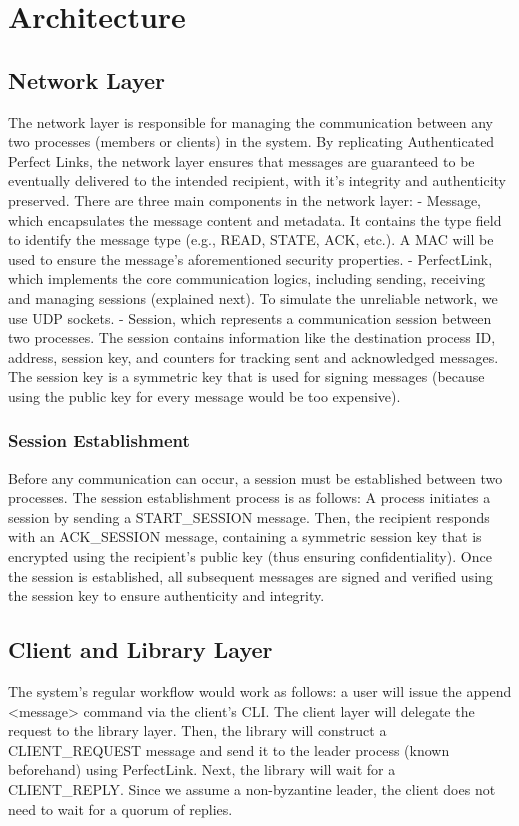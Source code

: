 \documentclass[runningheads]{llncs}
\begin{document}
\section{Architecture}
\subsection{Network Layer}
The network layer is responsible for managing the communication between any two
processes (members or clients) in the system. By replicating Authenticated
Perfect Links, the network layer ensures that messages are guaranteed to be
eventually delivered to the intended recipient, with it's integrity and
authenticity preserved. There are three main components in the network layer: 
%
- Message, which encapsulates the message content and metadata. It contains the
type field to identify the message type (e.g., READ, STATE, ACK, etc.). A MAC will
be used to ensure the message's aforementioned security properties.
%
- PerfectLink, which implements the core communication logics, including
sending, receiving and managing sessions (explained next). To simulate the
unreliable network, we use UDP sockets. 
%
- Session, which represents a communication session between two processes. The
session contains information like the destination process ID, address, session
key, and counters for tracking sent and acknowledged messages. The session key
is a symmetric key that is used for signing messages (because using the public key for
every message would be too expensive).
%
\subsubsection{Session Establishment}

Before any communication can occur, a session must be established between two
processes. The session establishment process is as follows: A process initiates
a session by sending a START\_SESSION message. Then, the recipient responds with an
ACK\_SESSION message, containing a symmetric session key that is encrypted using the recipient's public key (thus ensuring confidentiality). Once the session is
established, all subsequent messages are signed and verified using the session
key to ensure authenticity and integrity.
%
\subsection{Client and Library Layer}
The system's regular workflow would work as follows: a user will issue the append <message> command via the client's CLI. The client
layer will delegate the request to the library layer. Then, the library will
construct a CLIENT\_REQUEST message and send it to the leader process (known
beforehand) using PerfectLink. Next, the library will wait for a CLIENT\_REPLY.
Since we assume a non-byzantine leader, the client does not need to 
wait for a quorum of replies.
\end{document}
